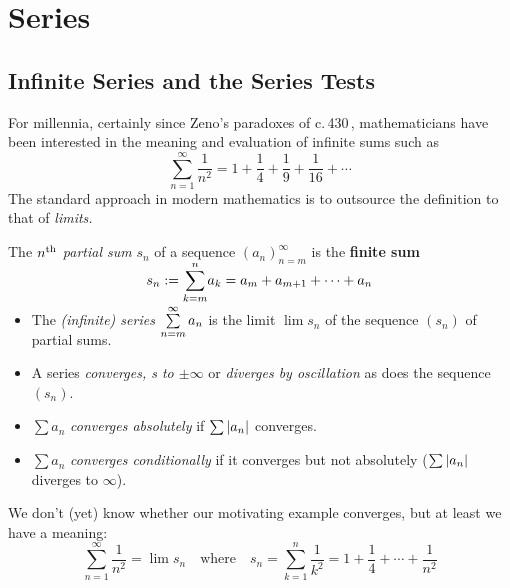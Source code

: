 \graphicspath{{3series/asy/}}

\thispagestyle{empty}

\setcounter{section}{2}
\section{Series}\label{chap:series}

\setcounter{subsection}{13}
\subsection{Infinite Series and the Series Tests}\label{sec:series}

For millennia, certainly since Zeno's paradoxes of c.\,430\,\BC, mathematicians have been interested in the meaning and evaluation of infinite sums such as
\[
	\sum_{n=1}^\infty \frac 1{n^2}=1+\frac 14+\frac 19+\frac 1{16}+\cdots
\]
The standard approach in modern mathematics is to outsource the definition to that of \emph{limits.}

\begin{defn}{}{}
	The \emph{$n\textsuperscript{th}$ partial sum} $s_n$ of a sequence $(a_n)_{n=m}^\infty$ is the \textbf{finite sum}
	\[
		s_n:=\smash{\sum_{k=m}^n}a_k=a_m+a_{m+1}+\cdots+a_n
	\]
	\begin{itemize}\itemsep2pt
	  \item The \emph{(infinite) series}\footnotemark{} $\smash[b]{\sum\limits_{n=m}^\infty a_n}$ is the limit $\lim s_n$ of the sequence $(s_n)$ of partial sums.
	  \item A series \emph{converges, s to $\pm\infty$} or \emph{diverges by oscillation} as does the sequence $(s_n)$.
	  \item $\sum a_n$ \emph{converges absolutely} if $\sum\left| a_n\right|$ converges.
	  \item $\sum a_n$ \emph{converges conditionally} if it converges but not absolutely ($\sum \left| a_n\right|$ diverges to $\infty$).
	\end{itemize}
\end{defn}


We don't (yet) know whether our motivating example converges, but at least we have a meaning:
\[
	\sum_{n=1}^\infty \frac 1{n^2}
	=\lim s_n\quad\text{where}\quad s_n=\sum\limits_{k=1}^n \frac 1{k^2}=1+\frac 14+\cdots+\frac 1{n^2}
\]

